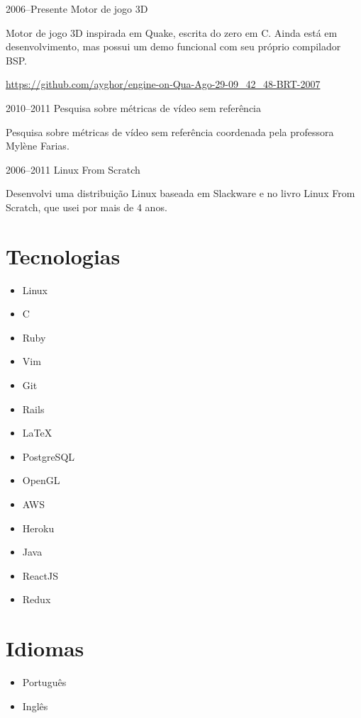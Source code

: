 \documentclass[a4paper,twoside]{simplecv}
\begin{document}
\begin{topic}
\item[2006--Presente] Motor de jogo 3D

	Motor de jogo 3D inspirada em Quake, escrita do zero em C. Ainda está
	em desenvolvimento, mas possui um demo funcional com seu próprio
	compilador BSP.

	{\scriptsize\url{https://github.com/ayghor/engine-on-Qua-Ago-29-09\_42\_48-BRT-2007}}

\item[2010--2011] Pesquisa sobre métricas de vídeo sem referência

	Pesquisa sobre métricas de vídeo sem referência coordenada pela
	professora Mylène Farias.

\item[2006--2011] Linux From Scratch

	Desenvolvi uma distribuição Linux baseada em Slackware e no livro Linux
	From Scratch, que usei por mais de 4 anos.
\end{topic}

\section{Tecnologias}

\begin{multicols}{4}
	\raggedcolumns
	\begin{itemize}
		\item Linux
		\item C
		\item Ruby
		\item Vim
		\item Git
		\item Rails
		\item \LaTeX{}
		\item PostgreSQL
		\item OpenGL
		\item AWS
		\item Heroku
		\item Java
		\item ReactJS
		\item Redux
	\end{itemize}
\end{multicols}

\section{Idiomas}

\begin{multicols}{4}
	\raggedcolumns
	\begin{itemize}
		\item Português
		\item Inglês
	\end{itemize}
\end{multicols}

%
\end{document}
